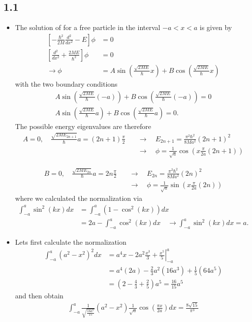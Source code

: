 \documentclass[10pt,a4paper]{book}
\theoremstyle{definition}
\begin{document}
\subsection{1.1}
\begin{itemize}
\item The solution of for a free particle in the interval $-a<x<a$ is given by
\begin{align}
    \left[-\frac{\hbar^2}{2M}\frac{d^2}{dx^2}-E\right]\phi&=0\\
    \left[\frac{d^2}{dx^2}+\frac{2ME}{\hbar^2}\right]\phi&=0\\
    \rightarrow\phi&=A\sin\left(\frac{\sqrt{2ME}}{\hbar}x\right)+B\cos\left(\frac{\sqrt{2ME}}{\hbar}x\right)
\end{align}    
with the two boundary conditions
\begin{align} 
A\sin\left(\frac{\sqrt{2ME}}{\hbar}(-a)\right)+B\cos\left(\frac{\sqrt{2ME}}{\hbar}(-a)\right)=0\\
A\sin\left(\frac{\sqrt{2ME}}{\hbar}a\right)+B\cos\left(\frac{\sqrt{2ME}}{\hbar}a\right)=0.
\end{align}
The possible energy eigenvalues are therefore
\begin{align}
    A=0,\quad\frac{\sqrt{2ME_{2n+1}}}{\hbar}a=(2n+1)\frac{\pi}{2}
    &\quad\rightarrow\quad E_{2n+1}=\frac{\pi^2\hbar^2}{8Ma^2}(2n+1)^2\\
    &\quad\rightarrow\quad
    \phi=\frac{1}{\sqrt{a}}\cos\left(x\frac{\pi}{2a}(2n+1)\right)
\end{align}   
    
\begin{align}    
    B=0,\quad\frac{\sqrt{2ME_{2n}}}{\hbar}a=2n\frac{\pi}{2}
    &\quad\rightarrow\quad E_{2n}=\frac{\pi^2\hbar^2}{8Ma^2}(2n)^2\\
    &\quad\rightarrow\quad
    \phi=\frac{1}{\sqrt{a}}\sin\left(x\frac{\pi}{2a}(2n)\right)
\end{align}
where we calculated the normalization via
\begin{align}
    \int_{-a}^a\sin^2(kx)dx
    &=\int_{-a}^a(1-\cos^2(kx))dx\\
    &=2a-\int_{-a}^a\cos^2(kx)dx\quad\rightarrow\int_{-a}^a\sin^2(kx)dx=a.
\end{align}

\item Lets first calculate the normalization
\begin{align}
    \int_{-a}^a(a^2-x^2)^2dx
    &=\left.a^4x-2a^2\frac{x^3}{3}+\frac{x^5}{5}\right|_{-a}^a\\
    &=a^4(2a)-\frac{2}{3}a^2(16a^3)+\frac{1}{5}(64a^5)\\
    &=\left(2-\frac{4}{3}+\frac{2}{5}\right)a^5=\frac{16}{15}a^5
\end{align}
and then obtain
\begin{align}
    \int_{-a}^a \frac{1}{\sqrt{\frac{16a^5}{15}}} \left(a^2-x^2\right)\frac{1}{\sqrt{a}} \cos \left(\frac{\pi  x}{2 a}\right)dx=\frac{8\sqrt{15}}{\pi^3}
\end{align}
\end{itemize}
\end{document}
